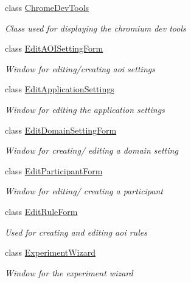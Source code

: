 \begin{DoxyCompactItemize}
\item 
class \hyperlink{class_web_analyzer_1_1_u_i_1_1_chrome_dev_tools}{Chrome\+Dev\+Tools}
\begin{DoxyCompactList}\small\item\em Class used for displaying the chromium dev tools \end{DoxyCompactList}\item 
class \hyperlink{class_web_analyzer_1_1_u_i_1_1_edit_a_o_i_setting_form}{Edit\+A\+O\+I\+Setting\+Form}
\begin{DoxyCompactList}\small\item\em Window for editing/creating aoi settings \end{DoxyCompactList}\item 
class \hyperlink{class_web_analyzer_1_1_u_i_1_1_edit_application_settings}{Edit\+Application\+Settings}
\begin{DoxyCompactList}\small\item\em Window for editing the application settings \end{DoxyCompactList}\item 
class \hyperlink{class_web_analyzer_1_1_u_i_1_1_edit_domain_setting_form}{Edit\+Domain\+Setting\+Form}
\begin{DoxyCompactList}\small\item\em Window for creating/ editing a domain setting \end{DoxyCompactList}\item 
class \hyperlink{class_web_analyzer_1_1_u_i_1_1_edit_participant_form}{Edit\+Participant\+Form}
\begin{DoxyCompactList}\small\item\em Window for editing/ creating a participant \end{DoxyCompactList}\item 
class \hyperlink{class_web_analyzer_1_1_u_i_1_1_edit_rule_form}{Edit\+Rule\+Form}
\begin{DoxyCompactList}\small\item\em Used for creating and editing aoi rules \end{DoxyCompactList}\item 
class \hyperlink{class_web_analyzer_1_1_u_i_1_1_experiment_wizard}{Experiment\+Wizard}
\begin{DoxyCompactList}\small\item\em Window for the experiment wizard \end{DoxyCompactList}\item 

\end{DoxyCompactItemize}
